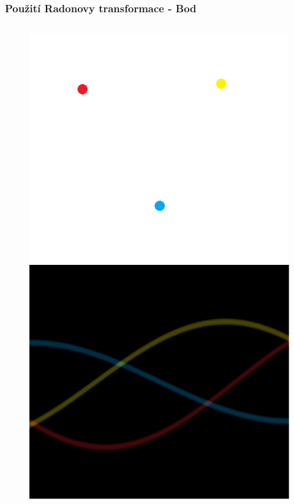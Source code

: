 \documentclass{beamer}
\begin{document}
\begin{frame}
\frametitle{Použití Radonovy transformace - Bod}
\begin{figure}
\begin{columns}
	  \includegraphics[width=\linewidth]{body.png}
	  \includegraphics[width=\linewidth]{body2.pdf}
\end{columns}
\end{figure}
\end{frame}
\end{document}
